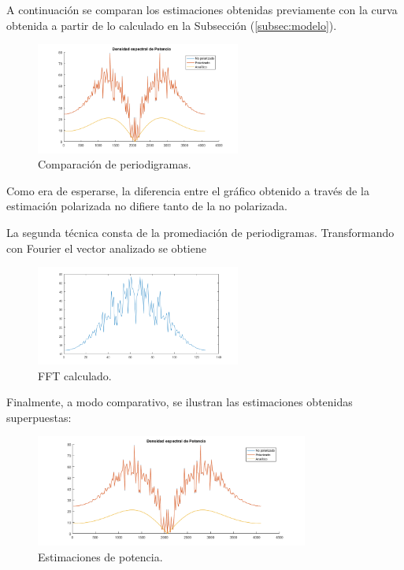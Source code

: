 A continuación se comparan los estimaciones obtenidas previamente con la curva obtenida a partir de lo calculado en la Subsección (\ref{subsec:modelo}).
\begin{figure}[H]
\centering
	\includegraphics[width=0.6\textwidth, trim = {0 0 0 0.725cm},clip]{./ImagenesEjercicio2/densidadPot.png}
	\caption{Comparación de periodigramas.}
	\label{fig:densidadPot}
\end{figure}

Como era de esperarse, la diferencia entre el gráfico obtenido a través de la estimación polarizada no difiere tanto de la no polarizada.

La segunda técnica consta de la promediación de periodigramas. Transformando con Fourier el vector analizado se obtiene
\begin{figure}[H]
\centering
	\includegraphics[width=0.6\textwidth, trim = {0 0 0 0.725cm},clip]{./ImagenesEjercicio2/period-calc.png}
	\caption{FFT calculado.}
	\label{fig:fft-calc}
\end{figure}

Finalmente, a modo comparativo, se ilustran las estimaciones obtenidas superpuestas:
\begin{figure}[H]
\centering
	\includegraphics[width=0.8\textwidth, trim = {0 0 0 0.725cm},clip]{./ImagenesEjercicio2/fft2.png}
	\caption{Estimaciones de potencia.}
	\label{fig:fft2}
\end{figure}

